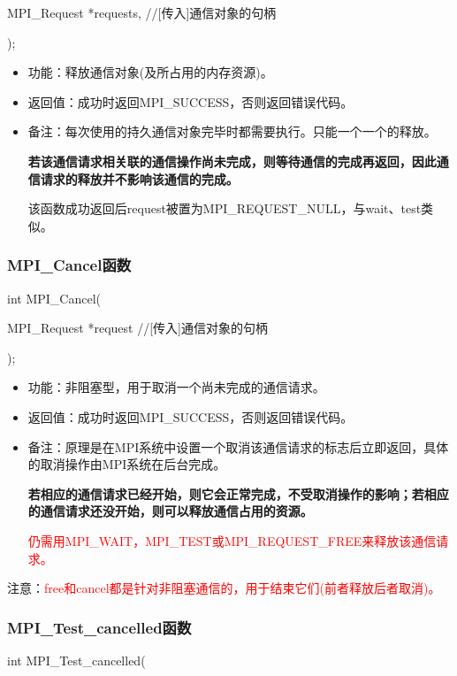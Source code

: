 \documentclass[UTF8]{article}%
\begin{document}
    \qquad MPI\_Request *requests, //[传入]通信对象的句柄

);

\begin{itemize}
    \item 功能：释放通信对象(及所占用的内存资源)。
    \item 返回值：成功时返回MPI\_SUCCESS，否则返回错误代码。
    \item 备注：每次使用的持久通信对象完毕时都需要执行。只能一个一个的释放。
    
    \textbf{若该通信请求相关联的通信操作尚未完成，则等待通信的完成再返回，因此通信请求的释放并不影响该通信的完成。}

    该函数成功返回后request被置为MPI\_REQUEST\_NULL，与wait、test类似。

\end{itemize}

\subsubsection{MPI\_Cancel函数}

int MPI\_Cancel(

    \qquad MPI\_Request *request //[传入]通信对象的句柄

);

\begin{itemize}
    \item 功能：非阻塞型，用于取消一个尚未完成的通信请求。
    \item 返回值：成功时返回MPI\_SUCCESS，否则返回错误代码。
    \item 备注：原理是在MPI系统中设置一个取消该通信请求的标志后立即返回，具体的取消操作由MPI系统在后台完成。
    
    \textbf{若相应的通信请求已经开始，则它会正常完成，不受取消操作的影响；若相应的通信请求还没开始，则可以释放通信占用的资源。}

    \textcolor{red}{仍需用MPI\_WAIT，MPI\_TEST或MPI\_REQUEST\_FREE来释放该通信请求。}

\end{itemize}

注意：\textcolor{red}{free和cancel都是针对非阻塞通信的，用于结束它们(前者释放后者取消)。}

\subsubsection{MPI\_Test\_cancelled函数}

int MPI\_Test\_cancelled(
\end{document}

